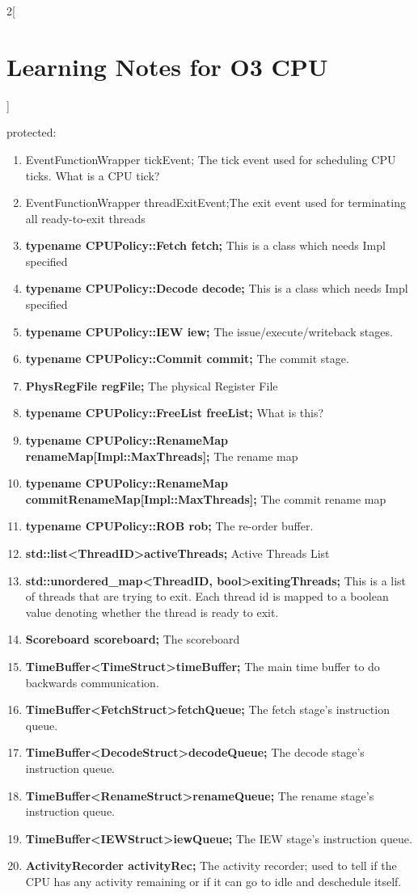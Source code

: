 \documentclass[11pt]{article}
\begin{document}
\begin{multicols}{2}[\section{Learning Notes for O3 CPU}]
\begin{enumerate}
		protected:
			\begin{enumerate}[label={\arabic*.}]
				\item EventFunctionWrapper tickEvent; The tick event used for scheduling CPU ticks. What is a CPU tick?
				\item EventFunctionWrapper threadExitEvent;The exit event used for terminating all ready-to-exit threads
				\item \textbf{typename CPUPolicy::Fetch fetch;} This is a class which needs Impl specified
				\item \textbf{typename CPUPolicy::Decode decode;} This is a class which needs Impl specified
				\item \textbf{typename CPUPolicy::IEW iew;} The issue/execute/writeback stages.
				\item \textbf{typename CPUPolicy::Commit commit;} The commit stage.
				\item \textbf{PhysRegFile regFile;} The physical Register File
				\item \textbf{typename CPUPolicy::FreeList freeList;} What is this?
				\item \textbf{typename CPUPolicy::RenameMap renameMap[Impl::MaxThreads];} The rename map
				\item \textbf{typename CPUPolicy::RenameMap commitRenameMap[Impl::MaxThreads];} The commit rename map
				\item \textbf{typename CPUPolicy::ROB rob;} The re-order buffer.
				\item \textbf{std::list\textless ThreadID\textgreater activeThreads;} Active Threads List
				\item \textbf{std::unordered\_map\textless ThreadID, bool\textgreater exitingThreads;} This is a list of threads that are trying to exit. Each thread id is mapped to a boolean value denoting whether the thread is ready to exit.
				\item \textbf{Scoreboard scoreboard;} The scoreboard
				\item \textbf{TimeBuffer\textless TimeStruct\textgreater timeBuffer;} The main time buffer to do backwards communication.
				\item \textbf{TimeBuffer\textless FetchStruct\textgreater fetchQueue;} The fetch stage's instruction queue.
				\item \textbf{TimeBuffer\textless DecodeStruct\textgreater decodeQueue;} The decode stage's instruction queue.
				\item \textbf{TimeBuffer\textless RenameStruct\textgreater renameQueue;} The rename stage's instruction queue.
				\item \textbf{TimeBuffer\textless IEWStruct\textgreater iewQueue;} The IEW stage's instruction queue.
				\item \textbf{ActivityRecorder activityRec;} The activity recorder; used to tell if the CPU has any activity remaining or if it can go to idle and deschedule itself.
				


\end{enumerate}
\end{enumerate}
\end{multicols}
\end{document}

